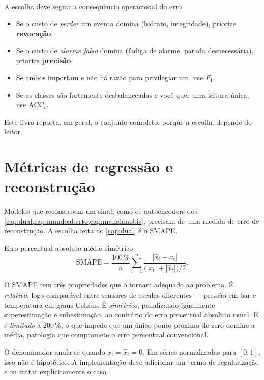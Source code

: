 \begin{destaque}
A escolha deve seguir a consequência operacional do erro.
\begin{itemize}[leftmargin=*,itemsep=0.2em]
  \item Se o custo de \emph{perder} um evento domina (hidrato, integridade), priorize
        \textbf{revocação}.
  \item Se o custo de \emph{alarme falso} domina (fadiga de alarme, parada
        desnecessária), priorize \textbf{precisão}.
  \item Se ambos importam e não há razão para privilegiar um, use $F_1$.
  \item Se as classes são fortemente desbalanceadas e você quer uma leitura única,
        use $\text{ACC}_b$.
\end{itemize}
Este livro reporta, em geral, o conjunto completo, porque a escolha depende do leitor.
\end{destaque}

\section{Métricas de regressão e reconstrução}

Modelos que reconstroem um sinal, como os autoencoders dos
\cref{cap:dual,cap:mundoaberto,cap:mahalanobis}, precisam de uma medida de erro de
reconstrução. A escolha feita no \cref{cap:dual} é o SMAPE.

\begin{definicao}{Erro percentual absoluto médio simétrico}
\begin{equation}
  \text{SMAPE} = \frac{100\,\%}{n} \sum_{t=1}^{n}
  \frac{\left| \hat{x}_t - x_t \right|}
       {\big(\left| x_t \right| + \left| \hat{x}_t \right|\big)/2}.
  \label{eq:smape}
\end{equation}
\end{definicao}

O SMAPE tem três propriedades que o tornam adequado ao problema. É \emph{relativo},
logo comparável entre sensores de escalas diferentes --- pressão em bar e temperatura
em graus Celsius. É \emph{simétrico}, penalizando igualmente superestimação e
subestimação, ao contrário do erro percentual absoluto usual. E é \emph{limitado} a
$200\,\%$, o que impede que um único ponto próximo de zero domine a média, patologia
que compromete o erro percentual convencional.

\begin{destaque}
O denominador anula-se quando $x_t = \hat{x}_t = 0$. Em séries normalizadas para
$[0,1]$, isso não é hipotético. A implementação deve adicionar um termo de
regularização $\epsilon$ ou tratar explicitamente o caso.
\end{destaque}

